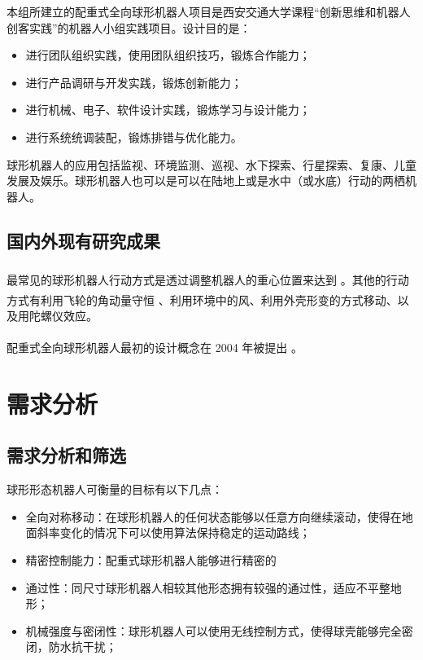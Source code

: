 \documentclass[a4paper]{ctexart}
\newcommand{ \upcite}[1]{\textsuperscript{\textsuperscript{\cite{#1} } }}
\numberwithin{equation}{section}
\numberwithin{table}{section}
\numberwithin{figure}{section}
\begin{document}
本组所建立的配重式全向球形机器人项目是西安交通大学课程“创新思维和机器人创客实践”的机器人小组实践项目。设计目的是：

\begin{itemize}
  \item 进行团队组织实践，使用团队组织技巧，锻炼合作能力；
  \item 进行产品调研与开发实践，锻炼创新能力；
  \item 进行机械、电子、软件设计实践，锻炼学习与设计能力；
  \item 进行系统统调装配，锻炼排错与优化能力。
\end{itemize}

球形机器人的应用包括监视、环境监测、巡视、水下探索、行星探索、复康、儿童发展及娱乐。球形机器人也可以是可以在陆地上或是水中（或水底）行动的两栖机器人。

\subsection{国内外现有研究成果}

最常见的球形机器人行动方式是透过调整机器人的重心位置来达到\upcite{halme1996motion}。其他的行动方式有利用飞轮的角动量守恒\upcite{joshi2010design}、利用环境中的风、利用外壳形变的方式移动、以及用陀螺仪效应。

配重式全向球形机器人最初的设计概念在 2004 年被提出\upcite{2004Introducing}。

\section{需求分析}

\subsection{需求分析和筛选}

球形形态机器人可衡量的目标有以下几点：

\begin{itemize}
  \item 全向对称移动：在球形机器人的任何状态能够以任意方向继续滚动，使得在地面斜率变化的情况下可以使用算法保持稳定的运动路线；
  \item 精密控制能力：配重式球形机器人能够进行精密的
  \item 通过性：同尺寸球形机器人相较其他形态拥有较强的通过性，适应不平整地形；
  \item 机械强度与密闭性：球形机器人可以使用无线控制方式，使得球壳能够完全密闭，防水抗干扰；
\end{itemize}
\end{document}
